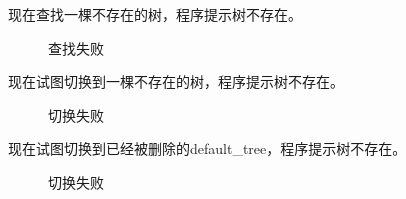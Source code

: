 \documentclass[supercite]{Experimental_Report}
\theoremstyle{definition}
\begin{document}
\clearpage
\noindent
现在查找一棵不存在的树，程序提示树不存在。
\begin{figure}[htbp]
	\centering
	\centering
	\caption{查找失败}
	\label{fig5-96}
\end{figure}

\noindent
现在试图切换到一棵不存在的树，程序提示树不存在。
\begin{figure}[htbp]
	\centering
	\centering
	\caption{切换失败}
	\label{fig5-97}
\end{figure}

\noindent
现在试图切换到已经被删除的default\_tree，程序提示树不存在。
\begin{figure}[H]
	\centering
	\centering
	\caption{切换失败}
	\label{fig5-98}
\end{figure}
\end{document}

